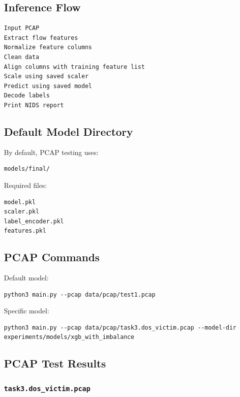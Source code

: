 \documentclass[12pt,a4paper]{article}
\begin{document}
\subsection{Inference Flow}

\begin{lstlisting}
Input PCAP
Extract flow features
Normalize feature columns
Clean data
Align columns with training feature list
Scale using saved scaler
Predict using saved model
Decode labels
Print NIDS report
\end{lstlisting}

\subsection{Default Model Directory}

By default, PCAP testing uses:

\begin{lstlisting}
models/final/
\end{lstlisting}

Required files:

\begin{lstlisting}
model.pkl
scaler.pkl
label_encoder.pkl
features.pkl
\end{lstlisting}

\subsection{PCAP Commands}

Default model:

\begin{lstlisting}
python3 main.py --pcap data/pcap/test1.pcap
\end{lstlisting}

Specific model:

\begin{lstlisting}
python3 main.py --pcap data/pcap/task3.dos_victim.pcap --model-dir experiments/models/xgb_with_imbalance
\end{lstlisting}

\subsection{PCAP Test Results}

\subsubsection{\texttt{task3.dos\_victim.pcap}}
\end{document}
